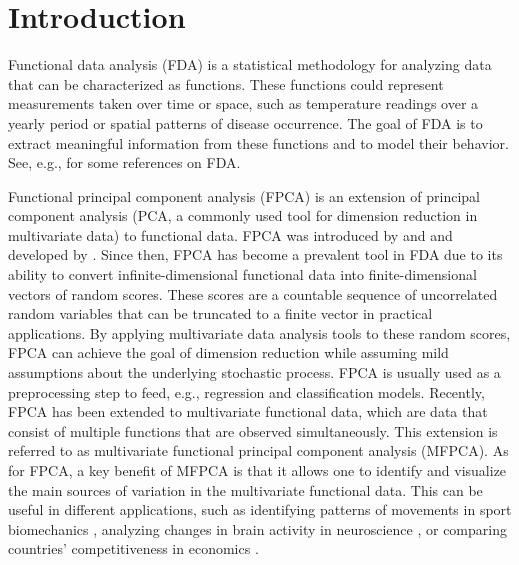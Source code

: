 \section{Introduction} %
\label{sec:introduction}

Functional data analysis (FDA) is a statistical methodology for analyzing data that can be characterized as functions. These functions could represent measurements taken over time or space, such as temperature readings over a yearly period or spatial patterns of disease occurrence. The goal of FDA is to extract meaningful information from these functions and to model their behavior. See, e.g., \cite{ramsayFunctionalDataAnalysis2005,horvathInferenceFunctionalData2012,wangFunctionalDataAnalysis2016,kokoszkaSpecialIssueFunctional2017} for some references on FDA.

Functional principal component analysis (FPCA) is an extension of principal component analysis (PCA, a commonly used tool for dimension reduction in multivariate data) to functional data. FPCA was introduced by \cite{karhunenUeberLineareMethoden1947} and \cite{loeveFonctionsAleatoiresStationnaires1945} and developed by \cite{dauxoisAsymptoticTheoryPrincipal1982}. Since then, FPCA has become a prevalent tool in FDA due to its ability to convert infinite-dimensional functional data into finite-dimensional vectors of random scores. These scores are a countable sequence of uncorrelated random variables that can be truncated to a finite vector in practical applications. By applying multivariate data analysis tools to these random scores, FPCA can achieve the goal of dimension reduction while assuming mild assumptions about the underlying stochastic process. FPCA is usually used as a preprocessing step to feed, e.g., regression and classification models. Recently, FPCA has been extended to multivariate functional data, which are data that consist of multiple functions that are observed simultaneously. This extension is referred to as multivariate functional principal component analysis (MFPCA). As for FPCA, a key benefit of MFPCA is that it allows one to identify and visualize the main sources of variation in the multivariate functional data. This can be useful in different applications, such as identifying patterns of movements in sport biomechanics \citep{warmenhovenBivariateFunctionalPrincipal2019}, analyzing changes in brain activity in neuroscience \citep{songSparseMultivariateFunctional2022}, or comparing  countries' competitiveness in economics \citep{krzyskoMultidimensionalEconomicIndicators2022}.

